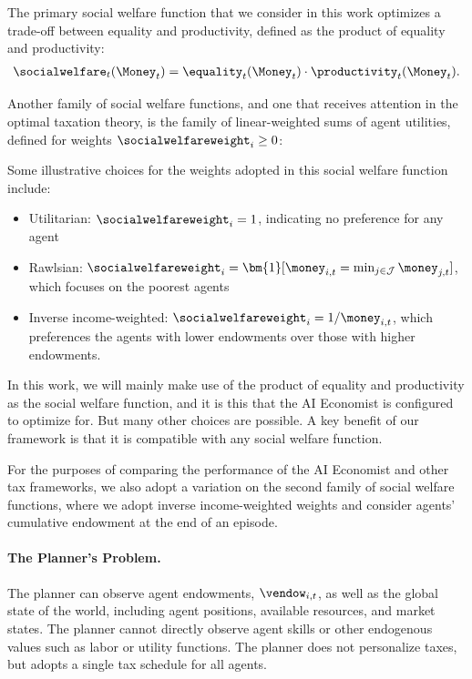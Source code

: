 The primary social welfare function that we consider in this work  optimizes a trade-off between equality and productivity, defined as the product of equality and productivity:
\begin{align}
 \label{eq:eqprodswf}
 \socialwelfare_t(\Money_t) = \equality_t(\Money_t) \cdot \productivity_t(\Money_t).
\end{align}

Another family of social welfare functions, and one that receives attention in the  optimal taxation theory, is the family of linear-weighted sums of agent utilities, defined for  weights $\socialwelfareweight_i\geq 0$:


 Some illustrative choices for the weights adopted in this social welfare function include:
\begin{itemize}
 \item Utilitarian: $\socialwelfareweight_i=1$, indicating no preference for any agent
 \item Rawlsian: $\socialwelfareweight_i=\bm{1}[\money_{i,t} = \min_{j\in\mathcal{J}}\money_{j,t}]$, which  focuses on the poorest agents
 \item Inverse income-weighted: $\socialwelfareweight_i=1/\money_{i,t}$, which preferences the agents with lower endowments over those with higher endowments.
\end{itemize}

In this work, we will  mainly make use of the product of equality and productivity as the social welfare function, and it is this that the AI Economist is configured to optimize for. But many other choices are possible.
A key benefit of our framework is that it is compatible with any social welfare function.

For the purposes of comparing the performance of the AI Economist and other tax frameworks, we also adopt a variation on the second family of social welfare functions, where we adopt inverse income-weighted  weights and consider agents' cumulative endowment at the end of an episode.




\paragraph{The Planner's Problem.}
The planner can observe agent endowments, $\vendow_{i,t}$, as well as the global state of the world, including agent positions, available resources, and market states. The planner cannot directly observe agent skills or other endogenous values such as labor or utility functions. The planner does not personalize taxes, but adopts a single tax schedule for all agents.

